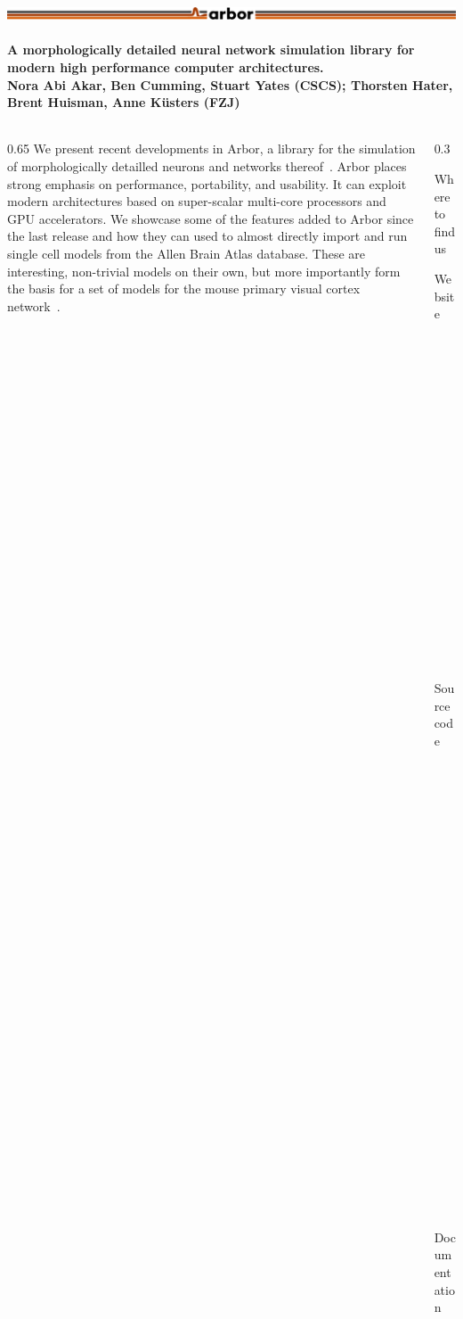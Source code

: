 \documentclass{beamer}
\begin{document}
\begin{frame}[t, fragile]
  \frametitle{\includegraphics[width=0.66\linewidth]{img/arbor-lines-proto-colour-full}}
  \framesubtitle{A morphologically detailed neural network simulation library for modern high performance computer architectures.\\
    \tiny{Nora Abi Akar, Ben Cumming, Stuart Yates (CSCS); Thorsten Hater, Brent Huisman, Anne Küsters (FZJ)}}

  \begin{columns}[onlytextwidth,T]
    \begin{column}{0.65\textwidth}
      We present recent developments in Arbor, a library for the simulation of
      morphologically detailled neurons and networks thereof~\cite{arbor}. Arbor
      places strong emphasis on performance, portability, and usability. It can
      exploit modern architectures based on super-scalar multi-core processors
      and GPU accelerators. We showcase some of the features added to Arbor
      since the last release and how they can used to almost directly import and
      run single cell models from the Allen Brain Atlas database. These are
      interesting, non-trivial models on their own, but more importantly form
      the basis for a set of models for the mouse primary visual cortex
      network~\cite{allen-v1}.
    \end{column}
    \begin{column}{0.3\textwidth}
      \begin{block}{Where to find us}
        \begin{description}
          \item[Website] \href{https://arbor-sim.github.i}{arbor-sim.github.io}
          \item[Source code] \href{https://github.com/arbor-sim/arbor}{github.com/arbor-sim/arbor}
          \item[Documentation] \href{https://arbor.readthedocs.io}{arbor.readthedocs.io}
          \item[Contact] \href{mailto:arbor-sim@fz-juelich.de}{arbor-sim@fz-juelich.de}
        \end{description}
      \end{block}
    \end{column}
  \end{columns}
  \vspace*{-2ex}
  \textbf{{\large{}}}\\


\end{frame}
\end{document}
